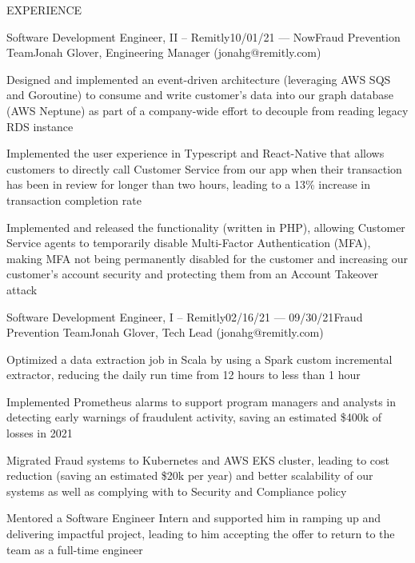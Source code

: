 \documentclass{resume} %
\begin{document}

\begin{rSection}{EXPERIENCE}

\begin{rSubsection}{Software Development Engineer, II  -- Remitly}{10/01/21 --- Now}{Fraud Prevention Team}{Jonah Glover, Engineering Manager (jonahg@remitly.com)}
    
    \item Designed and implemented an event-driven architecture (leveraging AWS SQS and Goroutine) to consume and write customer's data into our graph database (AWS Neptune) as part of a company-wide effort to decouple from reading legacy RDS instance
    \item Implemented the user experience in Typescript and React-Native that allows customers to directly call Customer Service from our app when their transaction has been in review for longer than two hours, leading to a 13\% increase in transaction  completion rate
    \item Implemented and released the functionality (written in PHP), allowing Customer Service agents to temporarily disable Multi-Factor Authentication (MFA), making MFA not being permanently disabled for the customer and increasing our customer's account security and protecting them from an Account Takeover attack

\end{rSubsection}

\begin{rSubsection}{Software Development Engineer, I -- Remitly}{02/16/21 --- 09/30/21}{Fraud Prevention Team}{Jonah Glover, Tech Lead (jonahg@remitly.com)}
    
    \item Optimized a data extraction job in Scala by using a Spark custom incremental extractor, reducing the daily run time from 12 hours to less than 1 hour
    \item Implemented Prometheus alarms to support program managers and analysts in detecting early warnings of fraudulent activity, saving an estimated \$400k of losses in 2021
    \item Migrated Fraud systems to Kubernetes and AWS EKS cluster, leading to cost reduction (saving an estimated \$20k per year) and better scalability of our systems as well as complying with to Security and Compliance policy 
    \item Mentored a Software Engineer Intern and supported him in ramping up and delivering impactful project, leading to him accepting the offer to return to the team as a full-time engineer


\end{rSubsection}
\end{rSection}
\end{document}
